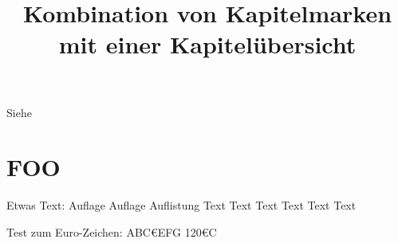 \documentclass[ngerman]{dtk}
\begin{document}
\title[Kurztitel 1]{Kombination von Kapitelmarken mit einer Kapitelübersicht}

\maketitle
\nocite{*}
Siehe~\cite{knuth:ct:a}

\section{FOO}

Etwas Text: Auflage Auf\-\hspace{0pt}lage Auflistung Text Text Text
Text Text Text

\bigskip

Test zum Euro-Zeichen: \Huge ABC€EFG 120€C

\clearpage

\printbibliography
\end{document}
